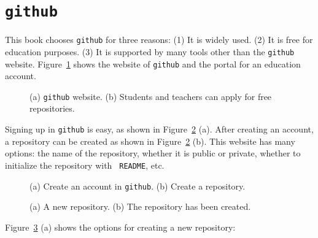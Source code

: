 \section{\tt github}

This book chooses {\tt github} for three reasons: (1) It is widely
used.  (2) It is free for education purposes. (3) It is supported by
many tools other than the {\tt github} website.
Figure~\ref{fig:github12} shows the website of {\tt github} and the
portal for an education account.

\begin{figure}[h] \centering
\caption{(a) {\tt github} website. (b) Students and teachers can apply for free repositories.}
\label{fig:github12}
\end{figure}

Signing up in {\tt github} is easy, as shown in
Figure~\ref{fig:github34} (a).  After creating an account, a
repository can be created as shown in Figure~\ref{fig:github34} (b).
This website has many options: the name of the repository, whether it
is public or private, whether to initialize the repository with {\tt
  README}, etc.


\begin{figure}[h] \centering
\caption{(a) Create an account in {\tt github}. (b) Create a
  repository.}
\label{fig:github34}
\end{figure}

\begin{figure}[h] \centering
\caption{(a) A new repository. (b) The repository has been created.}
\label{fig:github56}
\end{figure}


Figure~\ref{fig:github56} (a) shows the options for creating a new repository:


